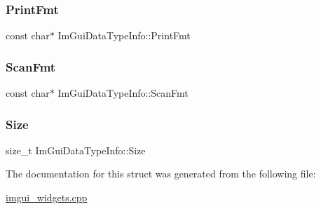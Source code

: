 \subsubsection{\texorpdfstring{Print\+Fmt}{PrintFmt}}
{\footnotesize\ttfamily const char$\ast$ Im\+Gui\+Data\+Type\+Info\+::\+Print\+Fmt}

\mbox{\label{struct_im_gui_data_type_info_aaa2d211e7cc5f03786f82650b69e9cf3}} 
\subsubsection{\texorpdfstring{Scan\+Fmt}{ScanFmt}}
{\footnotesize\ttfamily const char$\ast$ Im\+Gui\+Data\+Type\+Info\+::\+Scan\+Fmt}

\mbox{\label{struct_im_gui_data_type_info_a49a2b2d99b93b7db968a74d92380ecbf}} 
\subsubsection{\texorpdfstring{Size}{Size}}
{\footnotesize\ttfamily size\+\_\+t Im\+Gui\+Data\+Type\+Info\+::\+Size}



The documentation for this struct was generated from the following file\+:\begin{DoxyCompactItemize}
\item 
\mbox{\hyperlink{imgui__widgets_8cpp}{imgui\+\_\+widgets.\+cpp}}\end{DoxyCompactItemize}
